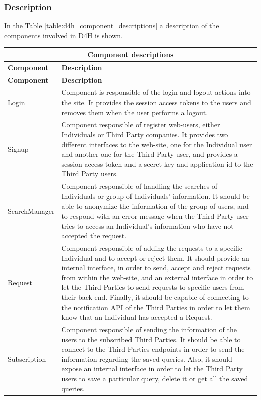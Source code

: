 \documentclass[a4paper, hidelinks, 12pt]{report}
\begin{document}
			\subsubsection{Description}
			In the Table \ref{table:d4h_component_descriptions} a description of the components involved in D4H is shown.
			
		\begin{longtable}{l p{}}
			\hline\hline
			\multicolumn{2}{c}{\textbf{Component descriptions}} \\
			\hline
			\textbf{Component} & \textbf{Description} \\ [0.5ex]
			\hline
			\endfirsthead
			\hline
			\textbf{Component} & \textbf{Description} \\ [0.5ex]
			\hline
			\endhead
			Login & Component is responsible of the login and logout actions into the site. It provides the session access tokens to the users and removes them when the user performs a logout. \\
			
			Signup & Component responsible of register web-users, either Individuals or Third Party companies. It provides two different interfaces to the web-site, one for the Individual user and another one for the Third Party user, and provides a session access token and a secret key and application id to the Third Party users. \\
			
			SearchManager & Component responsible of handling the searches of Individuals or group of Individuals' information. It should be able to anonymize the information of the group of users, and to respond with an error message when the Third Party user tries to access an Individual's information who have not accepted the request. \\
			
			Request & Component responsible of adding the requests to a specific Individual and to accept or reject them. It should provide an internal interface, in order to send, accept and reject requests from within the web-site, and an external interface in order to let the Third Parties to send requests to specific users from their back-end. Finally, it should be capable of connecting to the notification API of the Third Parties in order to let them know that an Individual has accepted a Request.\\
			
			Subscription & Component responsible of sending the information of the users to the subscribed Third Parties. It should be able to connect to the Third Parties endpoints in order to send the information regarding the saved queries. Also, it should expose an internal interface in order to let the Third Party users to save a particular query, delete it or get all the saved queries.\\
			

\end{longtable}
\end{document}
